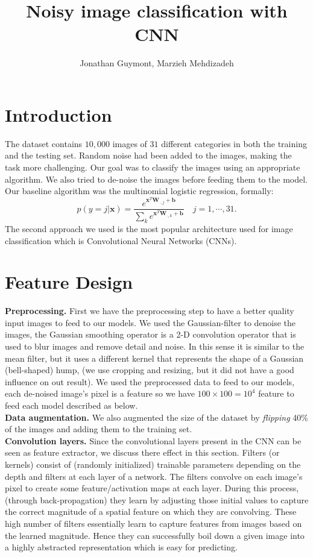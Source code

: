 \documentclass[12pt,english]{article}
\title{Noisy image classification with CNN}
\author{Jonathan Guymont, Marzieh Mehdizadeh}
\date{}
\begin{document}
\maketitle

\section{Introduction}
The dataset contains $10,000$ images of $31$ different categories in both the training and the testing set. Random noise had been added to the images, making the task more challenging. Our goal was to classify the images using an appropriate algorithm. We also tried to de-noise the images before feeding them to the model. Our baseline algorithm was the multinomial logistic regression, formally:
\begin{equation}
p(y=j|\bm{x})
= \frac{e^{\bm{x}^{T}\mathbf{W}_{\cdot, j}+\mathbf{b}}}{\sum_{k} e^{\bm{x}^{T}\mathbf{W}_{\cdot, k}+\mathbf{b}}} 
\quad 
j= 1,\cdots ,31.
\label{softmax}
\end{equation}
The second approach we used is the most popular architecture used for image classification which is Convolutional Neural Networks (CNNs).

\section{Feature Design}
\textbf{Preprocessing.} First we have the preprocessing step to have a better quality input images to feed to our models. We used the Gaussian-filter to denoise the images, the Gaussian smoothing operator is a 2-D convolution operator that is used to blur images and remove detail and noise. In this sense it is similar to the mean filter, but it uses a different kernel that represents the shape of a Gaussian (bell-shaped) hump, (we use cropping and resizing, but it did not have a good influence on out result). We used the preprocessed data to feed to our models, each de-noised image's pixel  is a feature so we have $100\times 100= 10^4$ feature to feed each model described as below.\\

\textbf{Data augmentation.} We also augmented the size of the dataset by \textit{flipping} 40\% of the images and adding them to the training set.\\

\textbf{Convolution layers.} Since the convolutional layers present in the CNN can be seen as feature extractor, we discuss there effect in this section. Filters (or kernels) consist of (randomly initialized) trainable parameters depending on the depth and filters at each layer of a network. The filters convolve on each image's pixel to create some feature/activation maps at each layer. During this process, (through back-propagation) they learn by adjusting those initial values to capture the correct magnitude of a spatial feature on which they are convolving. These high number of filters essentially learn to capture features from images based on the learned magnitude. Hence they can successfully boil down a given image into a highly abstracted representation which is easy for predicting.
\end{document}
